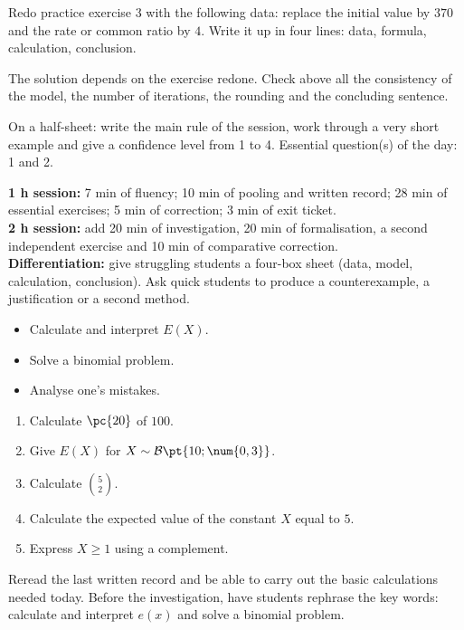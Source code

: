 
\begin{homework}Redo practice exercise 3 with the following data: replace the initial value by $370$ and the rate or common ratio by $4$. Write it up in four lines: data, formula, calculation, conclusion.\end{homework}
\begin{solution}The solution depends on the exercise redone. Check above all the consistency of the model, the number of iterations, the rounding and the concluding sentence.\end{solution}

\begin{exitticket}[3 minutes]On a half-sheet: write the main rule of the session, work through a very short example and give a confidence level from 1 to 4. Essential question(s) of the day: 1 and 2.\end{exitticket}

\ifmxteacher
\begin{method}
\textbf{1 h session:} 7 min of fluency; 10 min of pooling and written record; 28 min of essential exercises; 5 min of correction; 3 min of exit ticket.\\
\textbf{2 h session:} add 20 min of investigation, 20 min of formalisation, a second independent exercise and 10 min of comparative correction.\\
\textbf{Differentiation:} give struggling students a four-box sheet (data, model, calculation, conclusion). Ask quick students to produce a counterexample, a justification or a second method.
\end{method}
\fi
{}
\begin{objectives}\begin{itemize}\item Calculate and interpret $E(X)$.\item Solve a binomial problem.\item Analyse one's mistakes.\end{itemize}\end{objectives}
\begin{fluency}\begin{enumerate}\item Calculate $\pc{20}$ of $100$. \item Give $E(X)$ for $X\sim\mathcal B\pt{10;\num{0,3}}$. \item Calculate $\binom52$. \item Calculate the expected value of the constant $X$ equal to $5$. \item Express $X\geq1$ using a complement. \end{enumerate}\end{fluency}
\begin{prerequisites}Reread the last written record and be able to carry out the basic calculations needed today. Before the investigation, have students rephrase the key words: calculate and interpret $e(x)$ and solve a binomial problem.\end{prerequisites}

